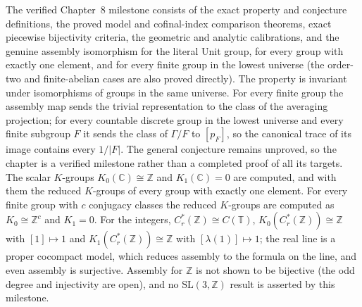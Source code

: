 The verified Chapter~8 milestone consists of the exact property and conjecture
definitions, the proved model and cofinal-index comparison theorems, exact
piecewise bijectivity criteria, the geometric and analytic calibrations,
and the genuine assembly isomorphism for the literal Unit group, for
every group with exactly one element, and for every finite group in the
lowest universe (the order-two and finite-abelian cases are also proved
directly). The property is invariant under isomorphisms of groups in the same
universe. For every finite group the assembly map sends the trivial
representation to the class of the averaging projection; for every
countable discrete group in the lowest universe and every finite subgroup $F$
it sends the class of $\Gamma/F$ to $[p_F]$, so the canonical trace of its
image contains every $1/|F|$. The general
conjecture remains unproved, so the chapter is a verified milestone rather
than a completed proof of all its targets. The scalar $K$-groups
$K_0(\mathbb C)\cong\mathbb Z$ and $K_1(\mathbb C)=0$ are computed, and with
them the reduced $K$-groups of every group with exactly one element. For
every finite group with $c$ conjugacy classes the reduced $K$-groups are
computed as $K_0\cong\mathbb Z^c$ and $K_1=0$. For the integers,
$C^*_r(\mathbb Z)\cong C(\mathbb T)$, $K_0(C^*_r(\mathbb Z))\cong\mathbb Z$ with
$[1]\mapsto1$ and $K_1(C^*_r(\mathbb Z))\cong\mathbb Z$ with
$[\lambda(1)]\mapsto1$; the real line is a proper cocompact model, which
reduces assembly to the formula on the line, and even assembly is surjective.
Assembly for $\mathbb Z$ is not shown to be bijective (the odd degree and
injectivity are open), and no $\mathrm{SL}(3,\mathbb Z)$ result is asserted
by this milestone.
